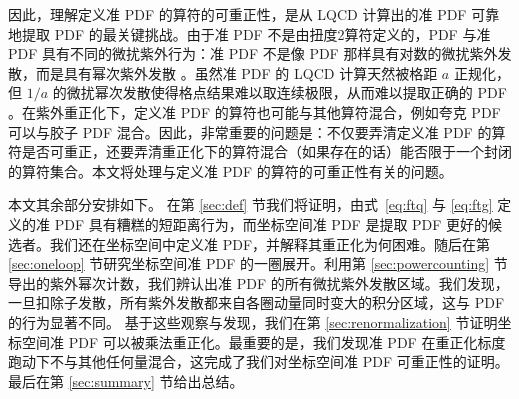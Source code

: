 因此，理解定义准 PDF 的算符的可重正性，是从 LQCD 计算出的准 PDF 可靠地提取 PDF 的最关键挑战。由于准 PDF 不是由扭度2算符定义的，PDF 与准 PDF 具有不同的微扰紫外行为：准 PDF 不是像 PDF 那样具有对数的微扰紫外发散，而是具有幂次紫外发散 \cite{Ma:2014jla,Xiong:2013bka}。虽然准 PDF 的 LQCD 计算天然被格距 $a$ 正规化，但 $1/a$ 的微扰幂次发散使得格点结果难以取连续极限，从而难以提取正确的 PDF \cite{Ishikawa:2016znu,Chen:2016fxx,Monahan:2016bvm,Alexandrou:2017huk, Chen:2017mzz}。在紫外重正化下，定义准 PDF 的算符也可能与其他算符混合，例如夸克 PDF 可以与胶子 PDF 混合。因此，非常重要的问题是：不仅要弄清定义准 PDF 的算符是否可重正，还要弄清重正化下的算符混合（如果存在的话）能否限于一个封闭的算符集合。本文将处理与定义准 PDF 的算符的可重正性有关的问题。


本文其余部分安排如下。
在第 \ref{sec:def} 节我们将证明，由式~\eqref{eq:ftq} 与 \eqref{eq:ftg} 定义的准 PDF 具有糟糕的短距离行为，而坐标空间准 PDF 是提取 PDF 更好的候选者。我们还在坐标空间中定义准 PDF，并解释其重正化为何困难。随后在第 \ref{sec:oneloop} 节研究坐标空间准 PDF 的一圈展开。利用第 \ref{sec:powercounting} 节导出的紫外幂次计数，我们辨认出准 PDF 的所有微扰紫外发散区域。我们发现，一旦扣除子发散，所有紫外发散都来自各圈动量同时变大的积分区域，这与 PDF 的行为显著不同。
基于这些观察与发现，我们在第 \ref{sec:renormalization} 节证明坐标空间准 PDF 可以被乘法重正化。最重要的是，我们发现准 PDF 在重正化标度跑动下不与其他任何量混合，这完成了我们对坐标空间准 PDF 可重正性的证明。最后在第 \ref{sec:summary} 节给出总结。
